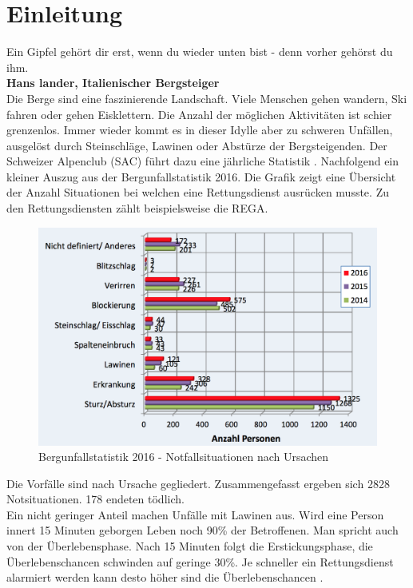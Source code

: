 \documentclass[11pt,english,german]{report}
\theoremstyle{definition}
\begin{document}
\chapter{Einleitung}
Ein Gipfel gehört dir erst, wenn du wieder unten bist - denn vorher gehörst du ihm.\\[0.3cm]
\textbf{Hans lander, Italienischer Bergsteiger\cite{kammerlander}} \\[0.5cm]
\noindent
Die Berge sind eine faszinierende Landschaft. Viele Menschen gehen wandern, Ski fahren oder gehen Eisklettern. Die Anzahl der möglichen Aktivitäten ist schier grenzenlos. Immer wieder kommt es in dieser Idylle aber zu schweren Unfällen, ausgelöst durch Steinschläge, Lawinen oder Abstürze der Bergsteigenden. Der Schweizer Alpenclub (SAC) führt dazu eine jährliche Statistik \cite{sacaccident}. Nachfolgend ein kleiner Auszug aus der Bergunfallstatistik 2016. Die Grafik zeigt eine Übersicht der Anzahl Situationen bei welchen eine Rettungsdienst ausrücken musste. Zu den Rettungsdiensten zählt beispielsweise die REGA.\\
\begin{figure}[H]
	\centering
	\includegraphics[width=\textwidth]{img/sac_accidentstatistic_2016_reason.png}
	\caption[Bergunfallstatistik 2016 - Notfallsituationen nach Unrsachen]
	{Bergunfallstatistik 2016 - Notfallsituationen nach Ursachen}
\end{figure}
\noindent
Die Vorfälle sind nach Ursache gegliedert. Zusammengefasst ergeben sich 2828 Notsituationen. 178 endeten tödlich.\\[0.3cm]
Ein nicht geringer Anteil machen Unfälle mit Lawinen aus. Wird eine Person innert 15 Minuten geborgen Leben noch 90\% der Betroffenen. Man spricht auch von der Überlebensphase. Nach 15 Minuten folgt die Erstickungsphase, die Überlebenschancen schwinden auf geringe 30\%. Je schneller ein Rettungsdienst alarmiert werden kann desto höher sind die Überlebenschancen \cite{avalancheaccident}. 
\end{document}
